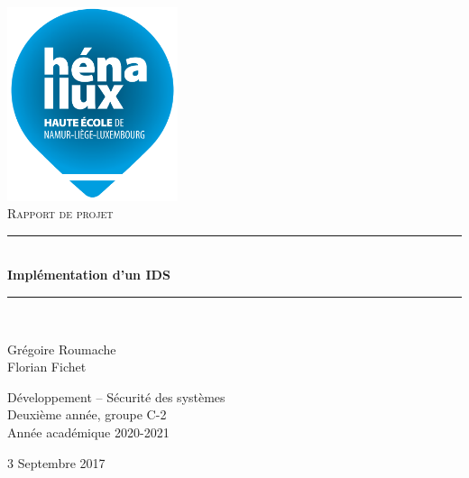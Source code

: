 \documentclass[a4paper]{article}
\newcommand{\HRule}{\rule{\linewidth}{0.5mm}}
\begin{document}
\begin{titlepage}
    \begin{sffamily}
        \begin{center}

            \includegraphics[width=5cm]{images/LogoHenallux.PNG}~\\[1.5cm]
            \textsc{\Large Rapport de projet}\\[1.5cm]

            \HRule \\[0.4cm]
            { \huge \bfseries Implémentation d'un IDS \\[0.4cm] }
            \HRule \\[2cm]

            \begin{minipage}{0.4\textwidth}
                \begin{flushleft} \large
                    Grégoire Roumache\\
                    Florian Fichet\\
                \end{flushleft}
            \end{minipage}
            \begin{minipage}{0.55\textwidth}
                \begin{flushright} \large
                    Développement -- Sécurité des systèmes\\
                    Deuxième année, groupe C-2 \\
                    Année académique 2020-2021\\
                \end{flushright}
            \end{minipage}
            \vfill

            {\large 3 Septembre 2017}

        \end{center}
    \end{sffamily}
\end{titlepage}
\end{document}
